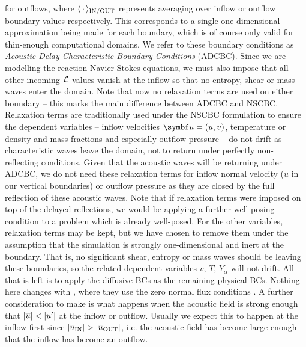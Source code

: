 for outflows, where $\langle\,\cdot\,\rangle_{\rm{IN/OUT}}$ represents averaging over inflow or outflow boundary values respectively. This corresponds to a single one-dimensional approximation being made for each boundary, which is of course only valid for thin-enough computational domains. We refer to these boundary conditions as \emph{Acoustic Delay Characteristic Boundary Conditions} (ADCBC). Since we are modelling the reaction Navier-Stokes equations, we must also impose that all other incoming $\cl{L}$ values vanish at the inflow so that no entropy, shear or mass waves enter the domain. Note that now no relaxation terms are used on either boundary -- this marks the main difference between ADCBC and NSCBC. Relaxation terms are traditionally used under the NSCBC formulation to ensure the dependent variables -- inflow velocities $\vb{u}=(u, v)$, temperature or density and mass fractions and especially outflow pressure -- do not drift as characteristic waves leave the domain, not to return under perfectly non-reflecting conditions. Given that the acoustic waves will be returning under ADCBC, we do not need these relaxation terms for inflow normal velocity ($u$ in our vertical boundaries) or outflow pressure as they are closed by the full reflection of these acoustic waves. Note that if relaxation terms were imposed on top of the delayed reflections, we would be applying a further well-posing condition to a problem which is already well-posed. For the other variables, relaxation terms may be kept, but we have chosen to remove them under the assumption that the simulation is strongly one-dimensional and inert at the boundary. That is, no significant shear, entropy or mass waves should be leaving these boundaries, so the related dependent variables $v$, $T$, $Y_α$ will not drift. All that is left is to apply the diffusive BCs as the remaining physical BCs. Nothing here changes with \cite{sutherland2003ImprovedBoundaryConditions}, where they use the zero normal flux conditions . A further consideration to make is what happens when the acoustic field is strong enough that $\abs{\overline{u}} < \abs{u'}$ at the inflow or outflow. Usually we expect this to happen at the inflow first since $\abs{\overline{u}_{\rm{IN}}} > \abs{\overline{u}_{\rm{OUT}}}$, i.e. the acoustic field has become large enough that the inflow has become an outflow. 



